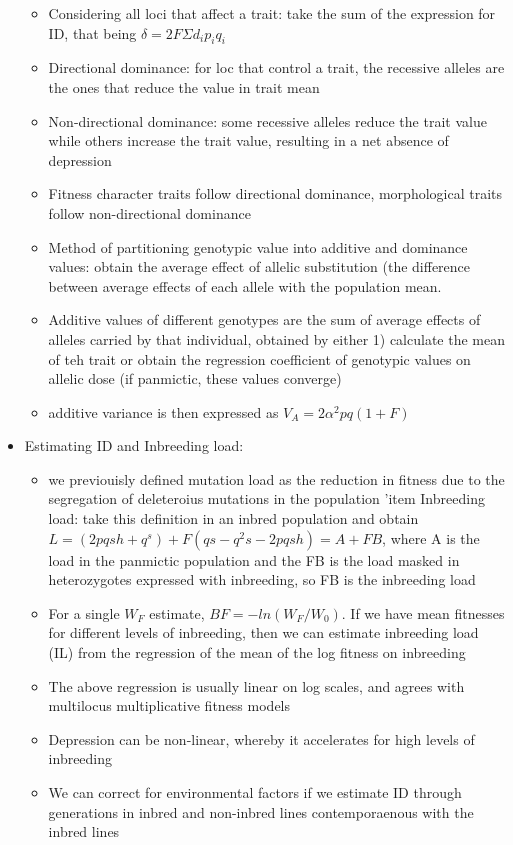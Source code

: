 \documentclass[12pt]{amsart}
\begin{document}
\begin{itemize}
\begin{itemize}
\item Considering all loci that affect a trait: take the sum of the expression for ID, that being $\delta = 2F\Sigma d_ip_iq_i$
\item Directional dominance: for loc that control a trait, the recessive alleles are the ones that reduce the value in trait mean
\item Non-directional dominance: some recessive alleles reduce the trait value while others increase the trait value, resulting in a net absence of depression
\item Fitness character traits follow directional dominance, morphological traits follow non-directional dominance
\item Method of partitioning genotypic value into additive and dominance values: obtain the average effect of allelic substitution (the difference between average effects of each allele with the population mean. 
\item Additive values of different genotypes are the sum of average effects of alleles carried by that individual, obtained by either 1) calculate the mean of teh trait or obtain the regression coefficient of genotypic values on allelic dose (if panmictic, these values converge)
\item additive variance is then expressed as $V_A = 2\alpha^2pq(1+F)$
\end{itemize}
\item Estimating ID and Inbreeding load:
\begin{itemize}
\item we previouisly defined mutation load as the reduction in fitness due to the segregation of deleteroius mutations in the population
'item Inbreeding load: take this definition in an inbred population and obtain $L = (2pqsh + q^s) + F(qs-q^2s-2pqsh) = A+FB$, where A is the load in the panmictic population and the FB is the load masked in heterozygotes expressed with inbreeding, so FB is the inbreeding load
\item For a single $W_F$ estimate, $BF = -ln(W_F/W_0)$. If we have mean fitnesses for different levels of inbreeding, then we can estimate inbreeding load (IL) from the regression of the mean of the log fitness on inbreeding
\item The above regression is usually linear on log scales, and agrees with multilocus multiplicative fitness models
\item Depression can be non-linear, whereby it accelerates for high levels of inbreeding
\item We can correct for environmental factors if we estimate ID through generations in inbred and non-inbred lines contemporaenous with the inbred lines 

\end{itemize}
\end{itemize}
\end{document}
